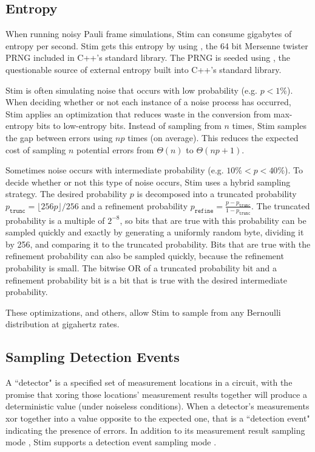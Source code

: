 \documentclass[onecolumn,unpublished]{quantumarticle}
\theoremstyle{definition}
\theoremstyle{definition}
\theoremstyle{definition}
\begin{document}
\subsection{Entropy}
\label{sec:randomness}

When running noisy Pauli frame simulations, Stim can consume gigabytes of entropy per second.
Stim gets this entropy by using , the 64 bit Mersenne twister PRNG included in C++'s standard library.
The PRNG is seeded using , the questionable \cite{cpprandomtroubles2020} source of external entropy built into C++'s standard library.

Stim is often simulating noise that occurs with low probability (e.g. $p < 1\%$).
When deciding whether or not each instance of a noise process has occurred, Stim applies an optimization that reduces waste in the conversion from max-entropy bits to low-entropy bits.
Instead of sampling from 
 $n$ times, Stim samples the gap between errors using  $np$ times (on average).
This reduces the expected cost of sampling $n$ potential errors from $\Theta(n)$ to $\Theta(np + 1)$.

Sometimes noise occurs with intermediate probability (e.g. $10\% < p < 40\%$).
To decide whether or not this type of noise occurs, Stim uses a hybrid sampling strategy.
The desired probability $p$ is decomposed into a truncated probability $p_{\texttt{trunc}} = \lfloor 256p \rfloor / 256$ and a refinement probability $p_{\texttt{refine}} = \frac{p - p_{\texttt{trunc}}}{1 - p_{\texttt{trunc}}}$.
The truncated probability is a multiple of $2^{-8}$, so bits that are true with this probability can be sampled quickly and exactly by generating a uniformly random byte, dividing it by 256, and comparing it to the truncated probability.
Bits that are true with the refinement probability can also be sampled quickly, because the refinement probability is small.
The bitwise OR of a truncated probability bit and a refinement probability bit is a bit that is true with the desired intermediate probability.

These optimizations, and others, allow Stim to sample from any Bernoulli distribution at gigahertz rates.


\subsection{Sampling Detection Events}

A ``detector" is a specified set of measurement locations in a circuit, with the promise that xoring those locations' measurement results together will produce a deterministic value (under noiseless conditions).
When a detector's measurements xor together into a value opposite to the expected one, that is a ``detection event" indicating the presence of errors.
In addition to its measurement result sampling mode , Stim supports a detection event sampling mode .
\end{document}

